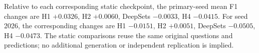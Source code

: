 Relative to each corresponding static checkpoint, the primary-seed mean F1 changes are H1 $+0.0326$, H2 $+0.0060$, DeepSets $-0.0033$, H4 $-0.0415$.  For seed 2026, the corresponding changes are H1 $-0.0151$, H2 $+0.0051$, DeepSets $-0.0505$, H4 $-0.0473$. The static comparisons reuse the same original questions and predictions; no additional generation or independent replication is implied.
